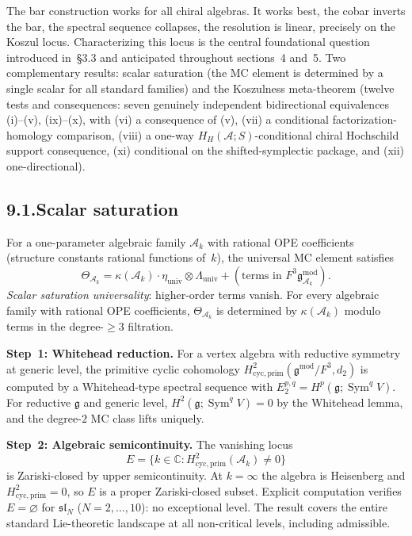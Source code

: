 \documentclass[11pt]{report}
\theoremstyle{definition}
\theoremstyle{remark}
\providecommand{\cA}{\mathcal{A}}
\numberwithin{equation}{section}
\begin{document}
The bar construction works for all chiral algebras. It works best,
the cobar inverts the bar, the spectral sequence collapses, the
resolution is linear, precisely on the Koszul locus. Characterizing
this locus is the central foundational question introduced in~\S3.3
and anticipated throughout sections~4 and~5. Two complementary
results: scalar saturation (the MC element is determined by a single
scalar for all standard families) and the Koszulness meta-theorem
(twelve tests and consequences: seven genuinely independent
bidirectional equivalences \textup{(i)--(v), (ix)--(x)}, with
\textup{(vi)} a consequence of \textup{(v)}, \textup{(vii)} a
conditional factorization-homology comparison, \textup{(viii)} a
one-way $H_H(\cA;S)$-conditional chiral Hochschild support consequence,
\textup{(xi)} conditional on the shifted-symplectic package, and
\textup{(xii)} one-directional).

\subsection*{9.1.\enspace Scalar saturation}

For a one-parameter algebraic family $\cA_k$ with rational OPE
coefficients (structure constants rational functions of~$k$), the
universal MC element satisfies
\[
\Theta_{\cA_k}=\kappa(\cA_k)\cdot\eta_{\mathrm{univ}}\otimes\Lambda_{\mathrm{univ}}+(\text{terms in }F^3\mathfrak g^{\mathrm{mod}}_{\cA_k}).
\]
\emph{Scalar saturation universality}: higher-order terms vanish. For
every algebraic family with rational OPE coefficients, $\Theta_{\cA_k}$
is determined by $\kappa(\cA_k)$ modulo terms in the degree-$\ge 3$
filtration.

\medskip
\noindent\textbf{Step~1: Whitehead reduction.}\enspace
For a vertex algebra with reductive symmetry at generic level, the
primitive cyclic cohomology
$H^2_{\mathrm{cyc,prim}}(\mathfrak g^{\mathrm{mod}}/F^3,d_2)$ is
computed by a Whitehead-type spectral sequence with
$E_2^{p,q}=H^p(\mathfrak g;\operatorname{Sym}^q V)$. For reductive
$\mathfrak g$ and generic level, $H^2(\mathfrak g;\operatorname{Sym}^q V)=0$
by the Whitehead lemma, and the degree-$2$ MC class lifts uniquely.

\medskip
\noindent\textbf{Step~2: Algebraic semicontinuity.}\enspace
The vanishing locus
\[
E=\{k\in\mathbb C:H^2_{\mathrm{cyc,prim}}(\cA_k)\neq 0\}
\]
is Zariski-closed by upper semicontinuity. At $k=\infty$ the algebra
is Heisenberg and $H^2_{\mathrm{cyc,prim}}=0$, so $E$ is a proper
Zariski-closed subset. Explicit computation verifies $E=\varnothing$
for $\mathfrak{sl}_N$ ($N=2,\ldots,10$): no exceptional level. The
result covers the entire standard Lie-theoretic landscape at all
non-critical levels, including admissible.
\end{document}
